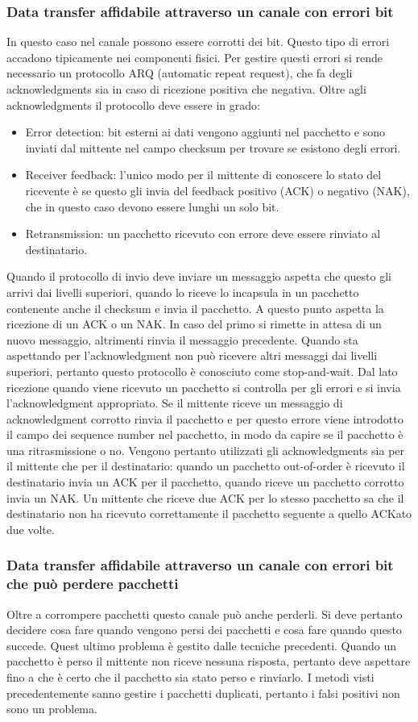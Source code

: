 \subsubsection{Data transfer affidabile attraverso un canale con errori bit}
In questo caso nel canale possono essere corrotti dei bit. Questo tipo di errori accadono tipicamente nei componenti fisici. Per gestire questi errori 
si rende necessario un protocollo ARQ (automatic repeat request), che fa degli acknowledgments sia in caso di ricezione positiva che negativa. Oltre agli
acknowledgments il protocollo deve essere in grado:
\begin{itemize}
\item Error detection: bit esterni ai dati vengono aggiunti nel pacchetto e sono inviati dal mittente nel campo checksum per trovare se esistono degli 
errori.
\item Receiver feedback: l'unico modo per il mittente di conoscere lo stato del ricevente \`e se questo gli invia del feedback positivo (ACK) o negativo
(NAK), che in questo caso devono essere lunghi un solo bit. 
\item Retransmission: un pacchetto ricevuto con errore deve essere rinviato al destinatario. 
\end{itemize}
Quando il protocollo di invio deve inviare un messaggio aspetta che questo gli arrivi dai livelli superiori, quando lo riceve lo incapsula in un pacchetto
contenente anche il checksum e invia il pacchetto. A questo punto aspetta la ricezione di un ACK o un NAK. In caso del primo si rimette in attesa di un 
nuovo messaggio, altrimenti rinvia il messaggio precedente. Quando sta aspettando per l'acknowledgment non pu\`o ricevere altri messaggi dai livelli 
superiori, pertanto questo protocollo \`e conosciuto come stop-and-wait. Dal lato ricezione quando viene ricevuto un pacchetto si controlla per gli errori
e si invia l'acknowledgment appropriato. Se il mittente riceve un messaggio di acknowledgment corrotto rinvia il pacchetto e per questo errore viene 
introdotto il campo dei sequence number nel pacchetto, in modo da capire se il pacchetto \`e una ritrasmissione o no. Vengono pertanto utilizzati gli 
acknowledgments sia per il mittente che per il destinatario: quando un pacchetto out-of-order \`e ricevuto il destinatario invia un ACK per il pacchetto, 
quando riceve un pacchetto corrotto invia un NAK. Un mittente che riceve due ACK per lo stesso pacchetto sa che il destinatario non ha ricevuto 
correttamente il pacchetto seguente a quello ACKato due volte. 
\subsubsection{Data transfer affidabile attraverso un canale con errori bit che pu\`o perdere pacchetti}
Oltre a corrompere pacchetti questo canale pu\`o anche perderli. Si deve pertanto decidere cosa fare quando vengono persi dei pacchetti e cosa fare quando
questo succede. Quest ultimo problema \`e gestito dalle tecniche precedenti. Quando un pacchetto \`e perso il mittente non riceve nessuna risposta, 
pertanto deve aspettare fino a che \`e certo che il pacchetto sia stato perso e rinviarlo. I metodi visti precedentemente sanno gestire i pacchetti 
duplicati, pertanto i falsi positivi non sono un problema.
